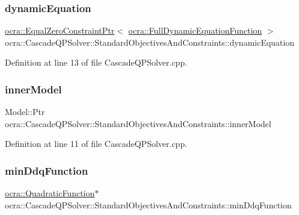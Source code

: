 \subsubsection{\texorpdfstring{dynamic\+Equation}{dynamicEquation}}
{\footnotesize\ttfamily \hyperlink{classocra_1_1EqualZeroConstraintPtr}{ocra\+::\+Equal\+Zero\+Constraint\+Ptr}$<$ \hyperlink{classocra_1_1FullDynamicEquationFunction}{ocra\+::\+Full\+Dynamic\+Equation\+Function} $>$ ocra\+::\+Cascade\+Q\+P\+Solver\+::\+Standard\+Objectives\+And\+Constraints\+::dynamic\+Equation}



Definition at line 13 of file Cascade\+Q\+P\+Solver.\+cpp.

\hypertarget{structocra_1_1CascadeQPSolver_1_1StandardObjectivesAndConstraints_afef3efb83bcd601ec3fb552baf7c5a22}{}\label{structocra_1_1CascadeQPSolver_1_1StandardObjectivesAndConstraints_afef3efb83bcd601ec3fb552baf7c5a22} 
\subsubsection{\texorpdfstring{inner\+Model}{innerModel}}
{\footnotesize\ttfamily Model\+::\+Ptr ocra\+::\+Cascade\+Q\+P\+Solver\+::\+Standard\+Objectives\+And\+Constraints\+::inner\+Model}



Definition at line 11 of file Cascade\+Q\+P\+Solver.\+cpp.

\hypertarget{structocra_1_1CascadeQPSolver_1_1StandardObjectivesAndConstraints_aecb4a6afb7cc5eb348017a0cfdf9e0ca}{}\label{structocra_1_1CascadeQPSolver_1_1StandardObjectivesAndConstraints_aecb4a6afb7cc5eb348017a0cfdf9e0ca} 
\subsubsection{\texorpdfstring{min\+Ddq\+Function}{minDdqFunction}}
{\footnotesize\ttfamily \hyperlink{classocra_1_1QuadraticFunction}{ocra\+::\+Quadratic\+Function}$\ast$ ocra\+::\+Cascade\+Q\+P\+Solver\+::\+Standard\+Objectives\+And\+Constraints\+::min\+Ddq\+Function}



